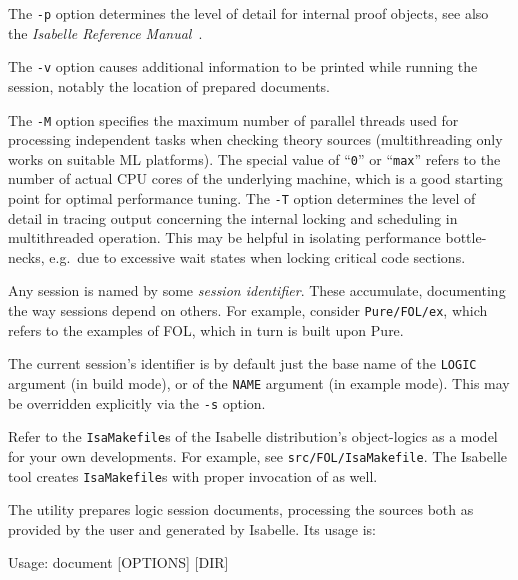 \begin{isabellebody}
\begin{isamarkuptext}
  \medskip The \verb|-p| option determines the level of detail
  for internal proof objects, see also the \emph{Isabelle Reference
  Manual}~\cite{isabelle-ref}.

  \medskip The \verb|-v| option causes additional information
  to be printed while running the session, notably the location of
  prepared documents.

  \medskip The \verb|-M| option specifies the maximum number of
  parallel threads used for processing independent tasks when checking
  theory sources (multithreading only works on suitable ML platforms).
  The special value of ``\verb|0|'' or ``\verb|max|'' refers
  to the number of actual CPU cores of the underlying machine, which
  is a good starting point for optimal performance tuning.  The
  \verb|-T| option determines the level of detail in tracing
  output concerning the internal locking and scheduling in
  multithreaded operation.  This may be helpful in isolating
  performance bottle-necks, e.g.\ due to excessive wait states when
  locking critical code sections.

  \medskip Any \hyperlink{tool.usedir}{\mbox{}} session is named by some \emph{session
  identifier}. These accumulate, documenting the way sessions depend
  on others. For example, consider \verb|Pure/FOL/ex|, which
  refers to the examples of FOL, which in turn is built upon Pure.

  The current session's identifier is by default just the base name of
  the \verb|LOGIC| argument (in build mode), or of the \verb|NAME| argument (in example mode). This may be overridden explicitly
  via the \verb|-s| option.%
\end{isamarkuptext}%
\isamarkuptrue%
%
\isamarkuptrue%
%
\begin{isamarkuptext}%
Refer to the \verb|IsaMakefile|s of the Isabelle distribution's
  object-logics as a model for your own developments.  For example,
  see \verb|src/FOL/IsaMakefile|.  The Isabelle \hyperlink{tool.mkdir}{\mbox{}} tool creates \verb|IsaMakefile|s with proper invocation
  of \hyperlink{tool.usedir}{\mbox{}} as well.%
\end{isamarkuptext}%
\isamarkuptrue%
%
\isamarkuptrue%
%
\begin{isamarkuptext}%
The \hypertarget{tool.document}{\hyperlink{tool.document}{\mbox{}}} utility prepares logic session documents,
  processing the sources both as provided by the user and generated by
  Isabelle.  Its usage is:
\begin{ttbox}
Usage: document [OPTIONS] [DIR]


\end{ttbox}
\end{isamarkuptext}
\end{isabellebody}
